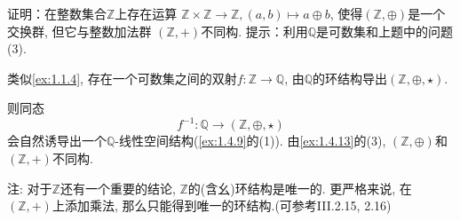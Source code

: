 \begin{problem}
    证明：在整数集合$\mathbb{Z}$上存在运算
$\mathbb{Z} \times \mathbb{Z} \to \mathbb{Z}, (a,b) \mapsto a \oplus b$,
使得$(\mathbb{Z}, \oplus)$是一个交换群, 但它与整数加法群
$(\mathbb{Z}, +)$不同构. 提示：利用$\mathbb{Q}$是可数集和上题中的问题(3).
\end{problem}

\begin{solution}
    类似\ref{ex:1.1.4}, 存在一个可数集之间的双射$f: \mathbb{Z} \to \mathbb{Q}$, 由$\mathbb{Q}$的环结构导出$(\mathbb{Z}, \oplus, \star)$.
    
    则同态
    \[
        f^{-1}: \mathbb{Q} \to (\mathbb{Z}, \oplus, \star)
    \]
    会自然诱导出一个$\mathbb{Q}$-线性空间结构(\ref{ex:1.4.9}的(1)). 由\ref{ex:1.4.13}的(3),
    $(\mathbb{Z}, \oplus)$和$(\mathbb{Z}, +)$不同构.

注: 对于$\mathbb{Z}$还有一个重要的结论, $\mathbb{Z}$的(含幺)环结构是唯一的. 更严格来说, 在$(\mathbb{Z}, +)$上添加乘法, 那么只能得到唯一的环结构.(可参考\cite{aluffi2009algebra}III.2.15, 2.16)
\end{solution}
